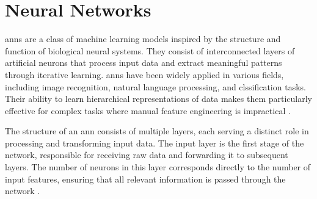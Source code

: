 





\section{Neural Networks}

\ac{ann}s are a class of machine learning models inspired by the structure and function of biological neural systems.
They consist of interconnected layers of artificial neurons that process input data and extract meaningful patterns through iterative learning.
\ac{ann}s have been widely applied in various fields, including image recognition, natural language processing, and clssification tasks.
Their ability to learn hierarchical representations of data makes them particularly effective for complex tasks where manual feature engineering is impractical \cite{dongare2012introduction}.

The structure of an \ac{ann} consists of multiple layers, each serving a distinct role in processing and transforming input data.
The input layer is the first stage of the network, responsible for receiving raw data and forwarding it to subsequent layers.
The number of neurons in this layer corresponds directly to the number of input features, ensuring that all relevant information is passed through the network \cite{dongare2012introduction}.

